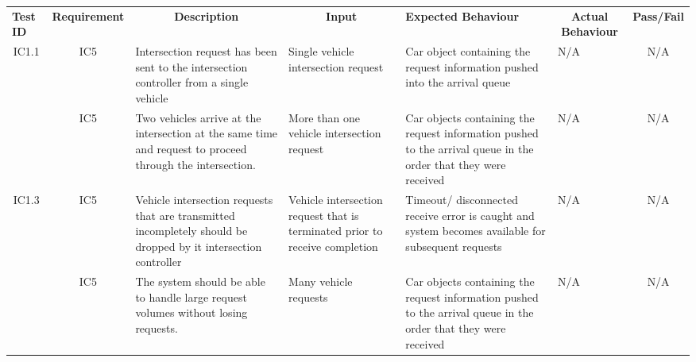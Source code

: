 \documentclass [10pt]{article}
\begin{document}
  \begin{longtable}{ | p{ } | p{ } |  p{ } |  p{ } | p{ } | p{ } |  p{ } |}  \hline

    \rowcolor{subsectionC}\textbf{Test ID}
    & \multicolumn{1}{c|}{\textbf{Requirement} }
    &\multicolumn{1}{c|}{\textbf{Description} }
    & \multicolumn{1}{c|}{\textbf{Input} }
    & \textbf{Expected Behaviour} 
    & \multicolumn{1}{c|}{\textbf{Actual Behaviour} }
    & \multicolumn{1}{c|}{\textbf{Pass/Fail}} \\  
    
    \multicolumn{1}{|c|}{IC1.1} 
    & \multicolumn{1}{c|}{IC5}
    & Intersection request has been sent to the intersection controller from a single vehicle
    & Single vehicle intersection request 
    & Car object containing the request information pushed into the arrival queue
    & N/A
    & \multicolumn{1}{|c|}{N/A}\\ 
    \rowcolor{tableCell}\multicolumn{1}{|c|}{IC1.2} 
    & \multicolumn{1}{c|}{IC5}
    & Two vehicles arrive at the intersection at the same time and request to proceed through the intersection. 
    & More than one vehicle intersection request 
    & Car objects containing the request information pushed to the arrival queue in the order that they were received 
    & N/A
    & \multicolumn{1}{|c|}{N/A}\\ 
    
    \multicolumn{1}{|c|}{IC1.3} 
    & \multicolumn{1}{c|}{IC5}
    & Vehicle intersection requests that are transmitted incompletely should be dropped by it intersection controller
    &  Vehicle intersection request that is terminated prior to receive completion
    & Timeout/ disconnected receive error is caught and system becomes available for subsequent requests
    & N/A
    & \multicolumn{1}{|c|}{N/A}\\ \hline
    
    
    \newpage \hline
  
    
    \rowcolor{tableCell}\multicolumn{1}{|c|}{IC1.4} 
    & \multicolumn{1}{c|}{IC5}
    & The system should be able to handle large request volumes without losing requests. 
    & Many vehicle requests
    &  Car objects containing the request information pushed to the arrival queue in the order that they were received 
    & N/A
    & \multicolumn{1}{|c|}{N/A}\\ \hline
    



\end{longtable}
\end{document}
